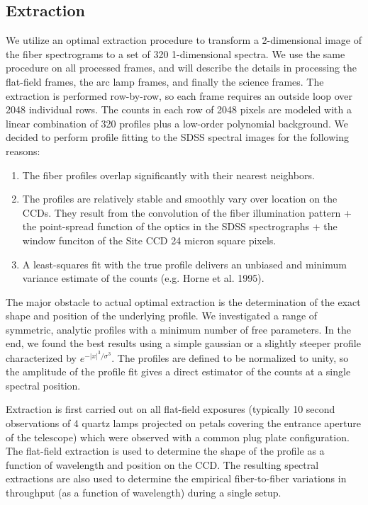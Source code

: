 

\subsection{Extraction}

We utilize an optimal extraction procedure to transform a 2-dimensional image of
the fiber spectrograms to a set of 320 1-dimensional spectra.  We use the same procedure
on all processed frames, and will describe the details in processing the flat-field frames, the
arc lamp frames, and finally the science frames.  
The extraction is performed row-by-row, so each frame requires an outside loop over 2048 individual rows.
The counts in each row of 2048 pixels are modeled with a linear combination of 320 profiles plus a low-order
polynomial background.  We decided to perform profile fitting to the SDSS spectral images 
for the following reasons:  

\begin{enumerate}

\item{The fiber profiles overlap significantly with their nearest neighbors.}

\item{The profiles are relatively stable and smoothly vary over location on the CCDs.  
They result from the convolution of the fiber illumination pattern + the point-spread function
of the optics in the SDSS spectrographs + the window funciton of the Site CCD 24 micron square pixels. }

\item{A least-squares fit with the true profile delivers an unbiased and minimum variance estimate of the counts
(e.g. Horne et al. 1995).}

\end{enumerate}

The major obstacle to actual optimal extraction is the determination of the exact shape and position 
of the underlying profile.  We investigated a range of symmetric, analytic profiles with a 
minimum number of free parameters.  In the end, we found the best results using a simple gaussian 
or a slightly steeper profile characterized by $e^{-|x|^3/\sigma^3}$.  The profiles
are defined to be normalized to unity, so the amplitude of the profile fit gives a direct estimator
of the counts at a single spectral position. 


Extraction is first carried out on all flat-field exposures (typically 10 second observations of
4 quartz lamps projected on petals covering the entrance aperture of the telescope) which were observed
with a common plug plate configuration.  The flat-field extraction is used to determine the shape of
the profile as a function of wavelength and position on the CCD.  The resulting spectral extractions are also used to 
determine the empirical fiber-to-fiber variations in throughput (as a function of wavelength) 
during a single setup.   





